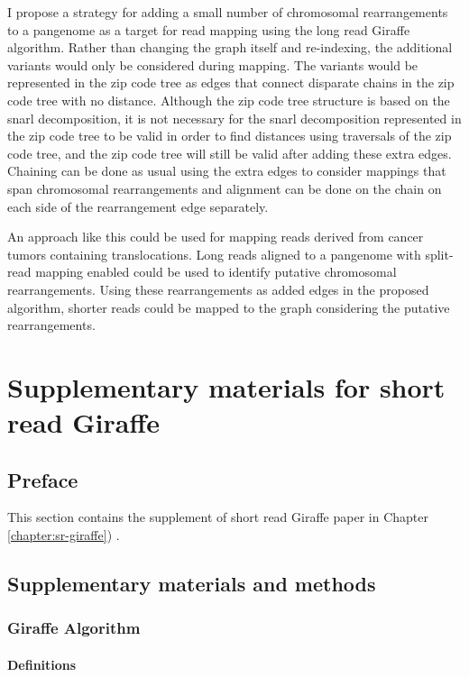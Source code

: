 \documentclass[11pt]{ucscthesis}
\begin{document}
I propose a strategy for adding a small number of chromosomal rearrangements to a pangenome as a target for read mapping using the long read Giraffe algorithm.
Rather than changing the graph itself and re-indexing, the additional variants would only be considered during mapping.
The variants would be represented in the zip code tree as edges that connect disparate chains in the zip code tree with no distance.
Although the zip code tree structure is based on the snarl decomposition, it is not necessary for the snarl decomposition represented in the zip code tree to be valid in order to find distances using traversals of the zip code tree, and the zip code tree will still be valid after adding these extra edges.
Chaining can be done as usual using the extra edges to consider mappings that span chromosomal rearrangements and alignment can be done on the chain on each side of the rearrangement edge separately.

An approach like this could be used for mapping reads derived from cancer tumors containing translocations.
Long reads aligned to a pangenome with split-read mapping enabled could be used to identify putative chromosomal rearrangements.
Using these rearrangements as added edges in the proposed algorithm, shorter reads could be mapped to the graph considering the putative rearrangements. 



\appendix
\chapter{Supplementary materials for short read Giraffe}
\label{sec:appendix_sr_giraffe}
\section{Preface}
This section contains the supplement of short read Giraffe paper in Chapter \ref{chapter:sr-giraffe}) \cite{sr_giraffe_2021}. 

\section{Supplementary materials and methods}
\subsection{Giraffe Algorithm}
\label{subsec:aim2:giraffe-methods}
\subsubsection{Definitions}
\end{document}
